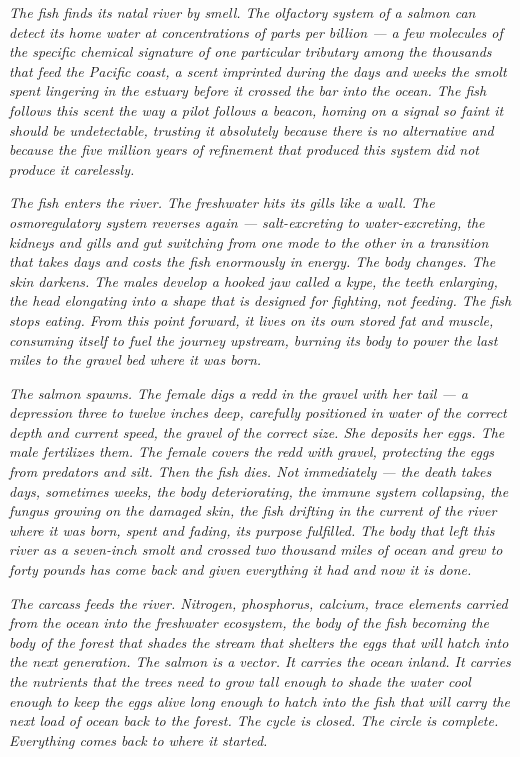 \documentclass[12pt, letterpaper]{article}
\begin{document}
\emph{The fish finds its natal river by smell. The olfactory system of a salmon can detect its home water at concentrations of parts per billion --- a few molecules of the specific chemical signature of one particular tributary among the thousands that feed the Pacific coast, a scent imprinted during the days and weeks the smolt spent lingering in the estuary before it crossed the bar into the ocean. The fish follows this scent the way a pilot follows a beacon, homing on a signal so faint it should be undetectable, trusting it absolutely because there is no alternative and because the five million years of refinement that produced this system did not produce it carelessly.}

\emph{The fish enters the river. The freshwater hits its gills like a wall. The osmoregulatory system reverses again --- salt-excreting to water-excreting, the kidneys and gills and gut switching from one mode to the other in a transition that takes days and costs the fish enormously in energy. The body changes. The skin darkens. The males develop a hooked jaw called a kype, the teeth enlarging, the head elongating into a shape that is designed for fighting, not feeding. The fish stops eating. From this point forward, it lives on its own stored fat and muscle, consuming itself to fuel the journey upstream, burning its body to power the last miles to the gravel bed where it was born.}

\emph{The salmon spawns. The female digs a redd in the gravel with her tail --- a depression three to twelve inches deep, carefully positioned in water of the correct depth and current speed, the gravel of the correct size. She deposits her eggs. The male fertilizes them. The female covers the redd with gravel, protecting the eggs from predators and silt. Then the fish dies. Not immediately --- the death takes days, sometimes weeks, the body deteriorating, the immune system collapsing, the fungus growing on the damaged skin, the fish drifting in the current of the river where it was born, spent and fading, its purpose fulfilled. The body that left this river as a seven-inch smolt and crossed two thousand miles of ocean and grew to forty pounds has come back and given everything it had and now it is done.}

\emph{The carcass feeds the river. Nitrogen, phosphorus, calcium, trace elements carried from the ocean into the freshwater ecosystem, the body of the fish becoming the body of the forest that shades the stream that shelters the eggs that will hatch into the next generation. The salmon is a vector. It carries the ocean inland. It carries the nutrients that the trees need to grow tall enough to shade the water cool enough to keep the eggs alive long enough to hatch into the fish that will carry the next load of ocean back to the forest. The cycle is closed. The circle is complete. Everything comes back to where it started.}
\end{document}
